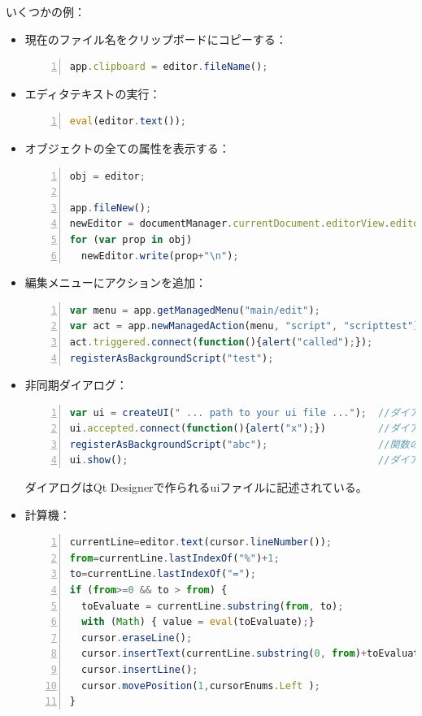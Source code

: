いくつかの例：

\begin{itemize}
\item
  現在のファイル名をクリップボードにコピーする：
\begin{lstlisting}[frame=single,language=JavaScript,numbers=left]
%SCRIPT
app.clipboard = editor.fileName();
\end{lstlisting}
\item
  エディタテキストの実行：
\begin{lstlisting}[frame=single,language=JavaScript,numbers=left]
%SCRIPT
eval(editor.text());
\end{lstlisting}
\item
  オブジェクトの全ての属性を表示する：
\begin{lstlisting}[frame=single,language=JavaScript,breaklines=true,numbers=left]
%SCRIPT
obj = editor;                                                    //表示するオブジェクト（例：現在のエディタ）

app.fileNew();                                                   //新しい文書を作成
newEditor = documentManager.currentDocument.editorView.editor;   //新しく作成された文書にアクセス
for (var prop in obj)
  newEditor.write(prop+"\n");                                    //属性を出力
\end{lstlisting}
\item
  編集メニューにアクションを追加：
\begin{lstlisting}[frame=single,language=JavaScript,breaklines=true,numbers=left]
%SCRIPT
var menu = app.getManagedMenu("main/edit");                   //編集メニューを入手
var act = app.newManagedAction(menu, "script", "scripttest"); //アクションを追加
act.triggered.connect(function(){alert("called");});          //簡単なハンドラを登録
registerAsBackgroundScript("test");                           //ハンドラを有効化し続ける
\end{lstlisting}
\item
  非同期ダイアログ：
\begin{lstlisting}[frame=single,language=JavaScript,breaklines=true,numbers=left]
%SCRIPT
var ui = createUI(" ... path to your ui file ...");  //ダイアログを読み込む
ui.accepted.connect(function(){alert("x");})         //ダイアログを閉じることに反応
registerAsBackgroundScript("abc");                   //関数の有効化を維持
ui.show();                                           //ダイアログの表示
\end{lstlisting}

  ダイアログはQt Designerで作られるuiファイルに記述されている。
\item
  計算機：
\begin{lstlisting}[frame=single,language=JavaScript,breaklines=true,numbers=left]
%SCRIPT
currentLine=editor.text(cursor.lineNumber());
from=currentLine.lastIndexOf("%")+1;
to=currentLine.lastIndexOf("=");
if (from>=0 && to > from) {
  toEvaluate = currentLine.substring(from, to);
  with (Math) { value = eval(toEvaluate);}
  cursor.eraseLine();
  cursor.insertText(currentLine.substring(0, from)+toEvaluate+"="+value);
  cursor.insertLine();
  cursor.movePosition(1,cursorEnums.Left );
}
\end{lstlisting}


\end{itemize}
